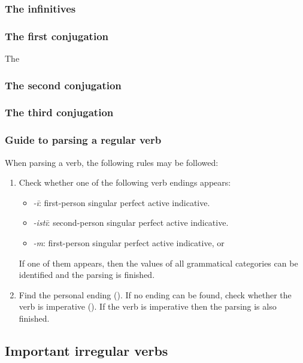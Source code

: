 \documentclass{article}
\newcommand*{\corpus}[1]{\emph{#1}}
\begin{document}
\subsubsection{The infinitives}

\subsubsection{The first conjugation}

The 

\subsubsection{The second conjugation}

\subsubsection{The third conjugation}

\subsubsection{Guide to parsing a regular verb}

When parsing a verb, the following rules may be followed:
\begin{enumerate}
    \item Check whether one of the following verb endings appears:
    \begin{itemize}
        \item \corpus{-ī}: first-person singular perfect active indicative.
        \item \corpus{-istī}: second-person singular perfect active indicative.
        \item \corpus{-m}: first-person singular perfect active indicative, 
        or %
    \end{itemize}
    If one of them appears, then the values of all grammatical categories can be identified
    and the parsing is finished.
    \item Find the personal ending ().
    If no ending can be found, 
    check whether the verb is imperative ().
    If the verb is imperative then the parsing is also finished.
\end{enumerate}

\subsection{Important irregular verbs}\label{sec:irregular-verb}
\end{document}
